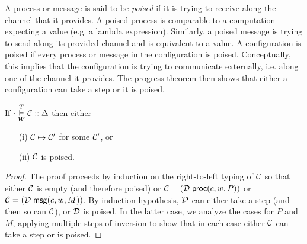 A process or message is said to be \emph{poised} if it is trying to
receive along the channel that it provides.  A poised process is
comparable to a computation expecting a value (e.g. a lambda expression).
Similarly, a poised message is trying to send along its provided channel and is equivalent to a value.
A configuration is poised if every process or message in the configuration is poised.
Conceptually, this implies that the configuration is trying to communicate
externally, i.e. along one of the channel it provides.
The progress theorem then shows that either a configuration can take a
step or it is poised.

\begin{theorem}
\label{thm:progress}
\mbox{}
If $\cdot \overset{T}{\underset{W}{\vDash}} \mathcal{C} :: \Delta$ then either
\begin{enumerate}
\item[(i)] $\mathcal{C} \mapsto \mathcal{C}'$ for some $\mathcal{C}'$, or
\item[(ii)] $\mathcal{C}$ is poised.
\end{enumerate}
\end{theorem}
\begin{proof}
The proof proceeds by induction on the right-to-left typing of $\mathcal{C}$ so that either
$\mathcal{C}$ is empty (and therefore poised) or
$\mathcal{C} = (\mathcal{D}\; \mathsf{proc}(c, w, P))$ or
$\mathcal{C} = (\mathcal{D}\; \mathsf{msg}(c, w, M))$. By induction hypothesis, $\mathcal{D}$ can
either take a step (and then so can $\mathcal{C}$), or $\mathcal{D}$ is poised.  In
the latter case, we analyze the cases for $P$ and $M$, applying multiple steps of
inversion to show that in each
case either $\mathcal{C}$ can take a step or is poised.
\end{proof}


